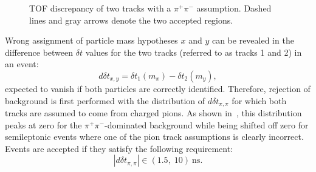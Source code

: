 \begin{figure}[h!]
  \centering
  \caption{TOF discrepancy of two tracks with a $\pi^+\pi^-$ assumption. Dashed lines and gray arrows denote the two accepted regions.}\label{fig:tof_12_t1_1}
\end{figure}

Wrong assignment of particle mass hypotheses $x$ and $y$ can be revealed in the difference between $\delta t$ values for the two tracks (referred to as tracks 1 and 2) in an event:
\begin{equation}
  \label{eq:tof2_t1}
  d\delta t_{x,y} = \delta t_1(m_x) - \delta t_2(m_y),
\end{equation}
expected to vanish if both particles are correctly identified. Therefore, rejection of background is first performed with the distribution of $d\delta t_{\pi,\pi}$ for which both tracks are assumed to come from charged pions. As shown in~, this distribution peaks at zero for the $\pi^+\pi^-$-dominated background while being shifted off zero for semileptonic events where one of the pion track assumptions is clearly incorrect. Events are accepted if they satisfy the following requirement:
\begin{equation*}
  |d\delta t_{\pi,\pi}| \in (1.5,\;10)\:\text{ns}.
\end{equation*}

